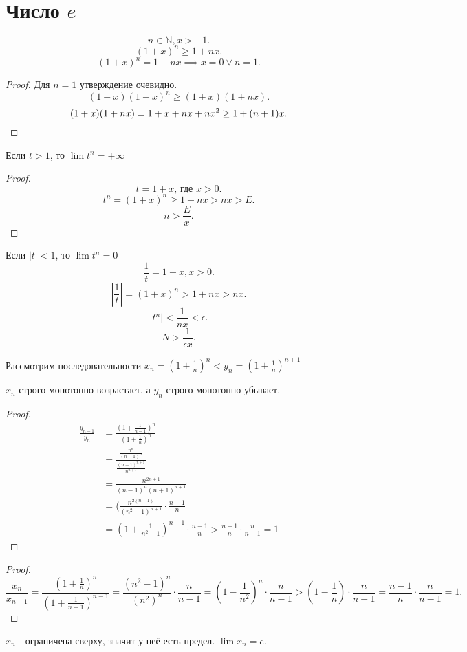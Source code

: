 \documentclass[11pt, oneside]{article}   	%
\begin{document}
\section{Число $e$}
\begin{theorem}
    \[ n\in \mathbb{N}, x>-1 .\]
    \[ (1+x)^{n}\ge 1+nx .\]
    \[ (1+x)^{n}=1+nx \implies x=0\lor n=1 .\] 
    \begin{proof}
        Для $n=1$ утверждение очевидно.\\
        \[ (1+x)(1+x)^{n} \ge (1+x)(1+nx) .\]
        \[ (1+x)(1+nx)= 1+x+nx+nx^2 \ge 1+(n+1)x . \qedhere\] 
    \end{proof}
\end{theorem}
\begin{tlemma}
    Если $t>1$, то  $\lim t^{n} = +\infty$ 
    \begin{proof}
        \[ t = 1+x\text{, где $x>0$} .\]
        \[ t^{n} = (1+x)^{n} \ge 1+nx>nx>E .\]
        \[ n>\frac{E}{x} .\] 
    \end{proof}
\end{tlemma}
\begin{tlemma}
    Если $|t|<1$, то  $\lim t^{n} = 0$ 
    \[ \frac{1}{t} = 1+x, x>0 .\]
    \[ |\frac{1}{t}|=(1+x)^{n}>1+nx>nx .\]
    \[ \left|t^n\right| < \frac{1}{nx}<\epsilon .\]
    \[ N > \frac{1}{\epsilon x} .\] 
\end{tlemma}
Рассмотрим последовательности $x_n = (1+\frac{1}{n})^{n} < y_n = (1+\frac{1}{n})^{n+1}$ 
\begin{theorem}
    $x_n$ строго монотонно возрастает, а  $y_n$ строго монотонно убывает. 
    \begin{proof}
        \begin{equation*}
            \begin{split}
                \frac{y_{n-1}}{y_n} &= \frac{(1+\frac{1}{n-1})^{n}}{(1+\frac{1}{n})^{n}}\\
                &= \frac{\frac{n^{n}}{(n-1)^{n}}}{\frac{(n+1)^{n+1}}{n^{n+1}}}\\
                &= \frac{n^{2n+1}}{(n-1)^{n}(n+1)^{n+1}}\\ 
                &= (\frac{n^{2(n+1)}}{(n^2-1)^{n+1}} \cdot \frac{n-1}{n}\\ 
                &= (1+\frac{1}{n^2-1})^{n+1}\cdot \frac{n-1}{n} > \frac{n-1}{n}\cdot \frac{n}{n-1} = 1 
            \end{split}
        \end{equation*}
    \end{proof} 
    \begin{proof}
        \[ \frac{x_n}{x_{n-1}} = \frac{(1+\frac{1}{n})^{n}}{(1+\frac{1}{n-1})^{n-1}} = \frac{(n^2-1)^{n}}{(n^2)^{n}} \cdot \frac{n}{n-1} = (1-\frac{1}{n^2})^{n}\cdot \frac{n}{n-1} > (1-\frac{1}{n})\cdot \frac{n}{n-1} = \frac{n-1}{n}\cdot \frac{n}{n-1} = 1.\] 
    \end{proof}
    $x_n$ - ограничена сверху, значит у неё есть предел. $\lim x_n = e$.
\end{theorem}
\end{document}
